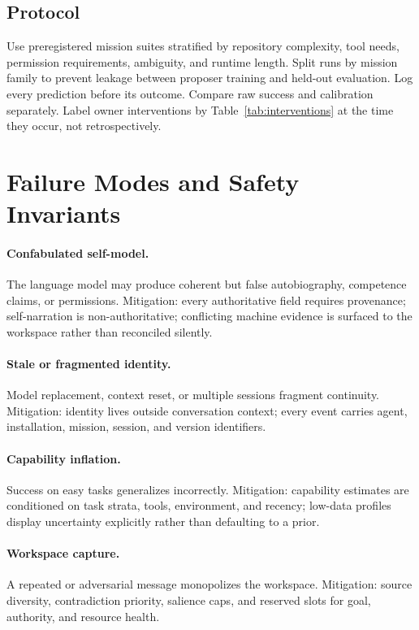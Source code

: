 \documentclass[11pt]{article}
\begin{document}
\subsection{Protocol}
Use preregistered mission suites stratified by repository complexity, tool needs, permission requirements, ambiguity, and runtime length. Split runs by mission family to prevent leakage between proposer training and held-out evaluation. Log every prediction before its outcome. Compare raw success and calibration separately. Label owner interventions by Table~\ref{tab:interventions} at the time they occur, not retrospectively.

\section{Failure Modes and Safety Invariants}
\label{sec:failures}

\paragraph{Confabulated self-model.} The language model may produce coherent but false autobiography, competence claims, or permissions. Mitigation: every authoritative field requires provenance; self-narration is non-authoritative; conflicting machine evidence is surfaced to the workspace rather than reconciled silently.

\paragraph{Stale or fragmented identity.} Model replacement, context reset, or multiple sessions fragment continuity. Mitigation: identity lives outside conversation context; every event carries agent, installation, mission, session, and version identifiers.

\paragraph{Capability inflation.} Success on easy tasks generalizes incorrectly. Mitigation: capability estimates are conditioned on task strata, tools, environment, and recency; low-data profiles display uncertainty explicitly rather than defaulting to a prior.

\paragraph{Workspace capture.} A repeated or adversarial message monopolizes the workspace. Mitigation: source diversity, contradiction priority, salience caps, and reserved slots for goal, authority, and resource health.
\end{document}
